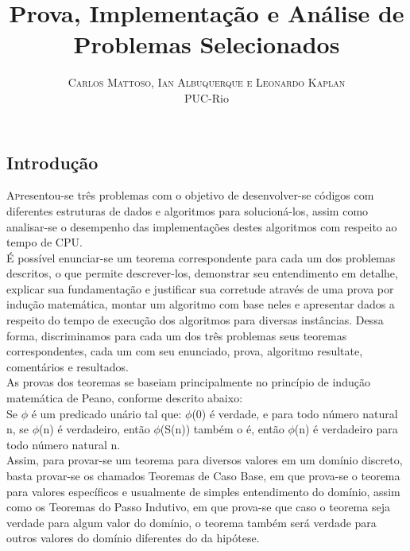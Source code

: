 \documentclass[twoside]{article}
\title{\vspace{-15mm}\fontsize{24pt}{10pt}\selectfont\textbf{Prova, Implementação e Análise de Problemas Selecionados}} %
\author{
\large
\textsc{Carlos Mattoso, Ian Albuquerque e Leonardo Kaplan}\\[2mm] %
\normalsize PUC-Rio \\ %
}
\date{}
\begin{document}
\maketitle %

\thispagestyle{fancy} %



\begin{multicols}{2} %

\section{Introdução}

\lettrine[nindent=0em,lines=3]{A}presentou-se três problemas com o objetivo de desenvolver-se códigos com diferentes estruturas de dados e algoritmos para solucioná-los, assim como analisar-se o desempenho das implementações destes algoritmos com respeito ao tempo de CPU.\\

É possível enunciar-se um teorema correspondente para cada um dos problemas descritos, o que permite descrever-los, demonstrar seu entendimento em detalhe, explicar sua fundamentação e justificar sua corretude através de uma prova por indução matemática, montar um algoritmo com base neles e apresentar dados a respeito do tempo de execução dos algoritmos para diversas instâncias. Dessa forma, discriminamos para cada um dos três problemas seus teoremas correspondentes, cada um com seu enunciado, prova,  algoritmo resultate, comentários e resultados.\\

As provas dos teoremas se baseiam principalmente no princípio de indução matemática de Peano, conforme descrito abaixo:\\

Se $\phi$ é um predicado unário tal que: $\phi$(0) é verdade, e para todo número natural n, se $\phi$(n) é verdadeiro, então $\phi$(S(n)) também o é, então $\phi$(n) é verdadeiro para todo número natural n.\\

Assim, para provar-se um teorema para diversos valores em um domínio discreto, basta provar-se os chamados Teoremas de Caso Base, em que prova-se o teorema para valores específicos e usualmente de simples entendimento do domínio, assim como os Teoremas do Passo Indutivo, em que prova-se que caso o teorema seja verdade para algum valor do domínio, o teorema também será verdade para outros valores do domínio diferentes do da hipótese.\\


\end{multicols}
\end{document}
